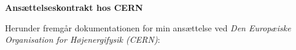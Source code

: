 \documentclass[../Ansoegning.tex]{subfiles}
\begin{document}
                                
\begin{center}
    \textbf{\LARGE{Ansættelseskontrakt hos CERN}}\vspace{-3ex}
\end{center}

Herunder fremgår dokumentationen for min ansættelse ved \textit{Den Europæiske Organisation for Højenergifysik (CERN)}:
\begin{minipage}{1\textwidth}

\end{minipage}
\end{document}

